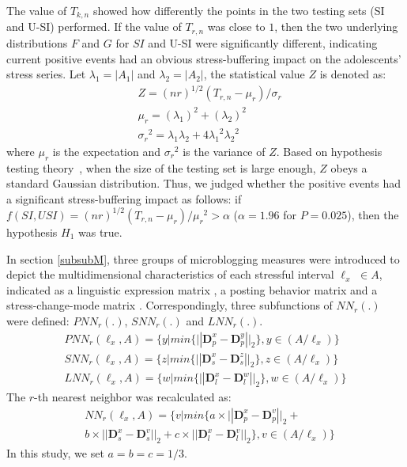 The value of $T_{k,n}$ showed how differently the points in the two testing sets (SI and U-SI) performed.
If the value of $T_{r,n}$ was close to $1$,
then the two underlying distributions $F$ and $G$ for $SI$ and U-SI were significantly different,
indicating current positive events had an obvious stress-buffering impact on the adolescents' stress series.
Let $\lambda_1=|A_1|$ and $\lambda_2=|A_2|$, the statistical value $Z$ is denoted as:
\begin{align}
&Z=(nr)^{1/2}(T_{r,n}-\mu_{r})/\sigma_{r}\\
&\mu_r=(\lambda_1)^2+(\lambda_2)^2\\
&{\sigma_r}^2=\lambda_1\lambda_2+4{\lambda_1}^2{\lambda_2}^2
\end{align}
where $\mu_r$ is the expectation and ${\sigma_r}^2$ is the variance of $Z$.
Based on hypothesis testing theory~\citep{Johnson2012Applied},
when the size of the testing set is large enough,
$Z$ obeys a standard Gaussian distribution.
Thus, we judged whether the positive events had a significant stress-buffering impact as follows:
if $f(SI,USI)=(nr)^{1/2}(T_{r,n}-\mu_{r})/{\mu_r}^2>\alpha$ ($\alpha = 1.96$ for $P=0.025$),
then the hypothesis $H_1$ was true.

In section \ref{subsubM},
three groups of microblogging measures
were introduced to depict the multidimensional characteristics of each stressful interval $\ell_x$ $\in A$,
indicated as a linguistic expression matrix , a posting behavior matrix 
and a stress-change-mode matrix .
Correspondingly, three subfunctions of $NN_r(.)$ were defined: $PNN_r(.)$, $SNN_r(.)$ and $LNN_r(.)$.
\begin{equation}
\begin{aligned}
& PNN_r(\ell_x,A)
= \{y | min\{||\textbf{D}_p^x-\textbf{D}_p^y ||_2\}, y\in(A/\ell_x)\} &\\
& SNN_r(\ell_x,A)
= \{z | min\{||\textbf{D}_s^x-\textbf{D}_s^z ||_2\}, z\in(A/\ell_x)\} \\
& LNN_r(\ell_x,A)
= \{w | min\{||\textbf{D}_l^x-\textbf{D}_l^w ||_2\}, w\in(A/\ell_x)\} &
 \end{aligned}
 \end{equation}
The $r$-th nearest neighbor was recalculated as:
\begin{align}
&NN_r(\ell_x,A) = \{v | min\{a \times ||\textbf{D}_p^x-\textbf{D}_p^v||_2+\\
&b \times ||\textbf{D}_s^x-\textbf{D}_s^v||_2+
c \times ||\textbf{D}_l^x-\textbf{D}_l^v||_2\}, v\in(A/\ell_x) \}
\end{align}
In this study, we set $a = b = c = 1/3$.


